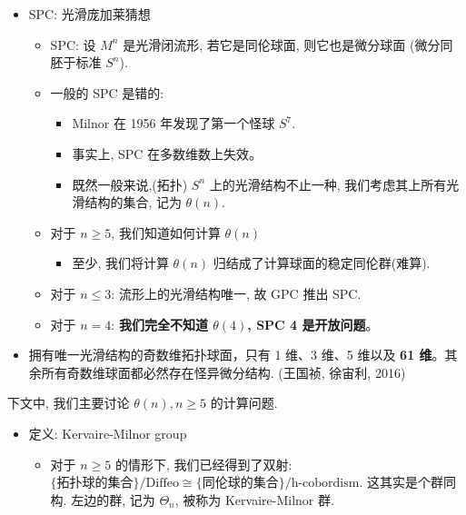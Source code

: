 \documentclass[
]{ctexart}
\providecommand{\tightlist}{%
  \setlength{\itemsep}{0pt}\setlength{\parskip}{0pt}}
\begin{document}
\begin{itemize}
\tightlist
\item
  SPC: 光滑庞加莱猜想

  \begin{itemize}
  \tightlist
  \item
    SPC: 设 \(M^n\) 是光滑闭流形, 若它是同伦球面, 则它也是微分球面
    (微分同胚于标准 \(S^n\)).
  \item
    一般的 SPC 是错的:

    \begin{itemize}
    \tightlist
    \item
      Milnor 在 1956 年发现了第一个怪球 \(S^7\).
    \item
      事实上, SPC 在多数维数上失效。
    \item
      既然一般来说,(拓扑) \(S^n\) 上的光滑结构不止一种,
      我们考虑其上所有光滑结构的集合, 记为 \(\theta\left(n\right)\).
    \end{itemize}
  \item
    对于 \(n\geq5\), 我们知道如何计算 \(\theta\left(n\right)\)

    \begin{itemize}
    \tightlist
    \item
      至少, 我们将计算 \(\theta\left(n\right)\)
      归结成了计算球面的稳定同伦群(难算).
    \end{itemize}
  \item
    对于 \(n\leq3\): 流形上的光滑结构唯一, 故 GPC 推出 SPC.
  \item
    对于 \(n=4\): \textbf{我们完全不知道 \(\theta\left(4\right)\), SPC 4
    是开放问题}。
  \end{itemize}
\item
  拥有唯一光滑结构的奇数维拓扑球面，只有 1 维、3 维、5 维以及 \textbf{61
  维}。其余所有奇数维球面都必然存在怪异微分结构. (王国祯, 徐宙利, 2016)
\end{itemize}

下文中, 我们主要讨论 \(\theta\left(n\right),n\ge 5\) 的计算问题.

\begin{itemize}
\tightlist
\item
  定义: Kervaire-Milnor group

  \begin{itemize}
  \tightlist
  \item
    对于 \(n\geq5\) 的情形下, 我们已经得到了双射:
    \(\{  拓扑球的集合 \}/ \text{Diffeo} \cong \{  同伦球的集合 \}/\text{h-cobordism}\).
    这其实是个群同构. 左边的群, 记为 \(\Theta_n\), 被称为
    Kervaire-Milnor 群.
  \end{itemize}
\end{itemize}
\end{document}
